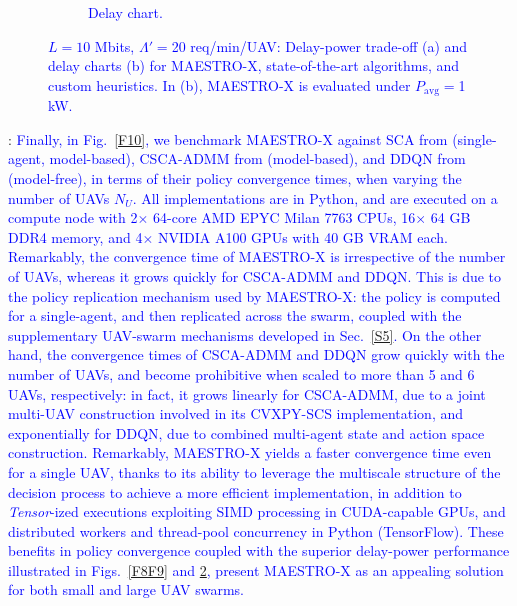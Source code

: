 \documentclass[12pt, draftcls, onecolumn]{IEEEtran}
\theoremstyle{plain}
\theoremstyle{definition}
\theoremstyle{remark}
\newcommand\hlt[1]{\textcolor{blue}{#1}}
\begin{document}
\begin{figure} [t]
\begin{subfigure}{0.448\linewidth}
         \caption{\hlt{Delay chart.}}
         \label{F9a}
     \end{subfigure}
     \vspace{-6mm}
     \caption{\hlt{$L{=}10$ Mbits, $\Lambda'{=}$20 req/min/UAV: Delay-power trade-off (a) and delay charts (b) for MAESTRO-X, state-of-the-art algorithms, and custom heuristics. In (b), MAESTRO-X is evaluated under $P_{\mathrm{avg}}=$1 kW.}}
     \label{F8aF9a}
\end{figure}

\noindent{\hlt{\underline{Policy convergence time}}}: \hlt{Finally, in Fig.~\ref{F10}, we benchmark MAESTRO-X against SCA from \cite{SCA} (single-agent, model-based), CSCA-ADMM from \cite{CSCA-ADMM} (model-based), and DDQN from \cite{DDQN} (model-free), in terms of their policy convergence times, when varying the number of UAVs $N_{U}$. All implementations are in Python, and are executed on a compute node with 2$\times$ 64-core AMD EPYC Milan 7763 CPUs, 16$\times$ 64 GB DDR4 memory, and 4$\times$ NVIDIA A100 GPUs with 40 GB VRAM each. Remarkably, the convergence time of MAESTRO-X is irrespective of the number of UAVs, whereas it grows quickly for CSCA-ADMM and DDQN. This is due to the policy replication mechanism used by MAESTRO-X: the policy is computed for a single-agent, and then replicated across the swarm, coupled with the supplementary UAV-swarm mechanisms developed in Sec.~\ref{S5}. On the other hand, the convergence times of CSCA-ADMM and DDQN grow quickly with the number of UAVs, and become prohibitive when scaled to more than 5 and 6 UAVs, respectively: in fact, it grows linearly for CSCA-ADMM, due to a joint multi-UAV construction involved in its CVXPY-SCS implementation, and exponentially for DDQN, due to combined multi-agent state and action space construction. Remarkably, MAESTRO-X yields a faster convergence time even for a single UAV, thanks to its ability to leverage the multiscale structure of the decision process to achieve a more efficient implementation, in addition to \emph{Tensor}-ized executions exploiting SIMD processing in CUDA-capable GPUs, and distributed workers and thread-pool concurrency in Python (TensorFlow). These benefits in policy convergence coupled with the superior delay-power performance illustrated in Figs.~\ref{F8F9} and \ref{F8aF9a}, present MAESTRO-X as an appealing solution for both small and large UAV swarms.}
\end{document}
